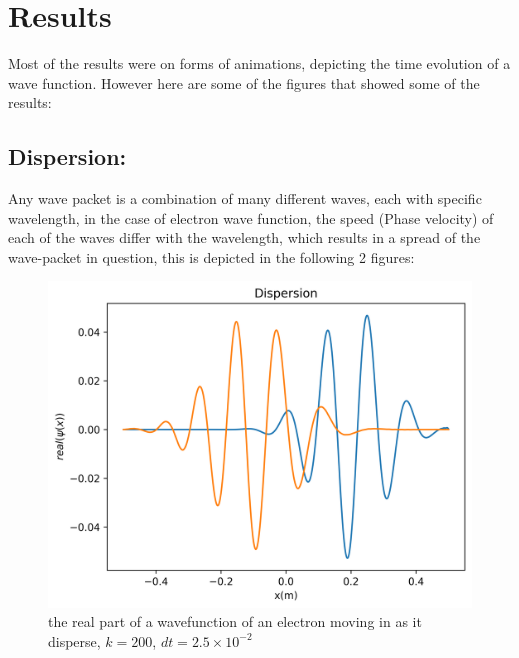 \documentclass[10pt, a4paper]{article}
\begin{document}
\newpage
\section{{\Large \textbf{Results}}}
\begin{adjustwidth}{1cm}{}
Most of the results were on forms of animations, depicting the time evolution of a wave function. However here are some of the figures that showed some of the results:
\subsection{Dispersion:}
Any wave packet is a combination of many different waves, each with specific wavelength, in the case of electron wave function, the speed (Phase velocity) of each of the waves differ with the wavelength, which results in a spread of the wave-packet in question, this is depicted in the following 2 figures:
\begin{figure}[H]
    \centering
    \includegraphics[scale = 0.6]{DispersionR.png}
    \caption{the real part of a wavefunction of an electron moving in as it disperse, $k = 200$, $dt = 2.5\times10^{-2}$}
    \label{fig:dispersion_realpart}
\end{figure}


\end{adjustwidth}
\end{document}
